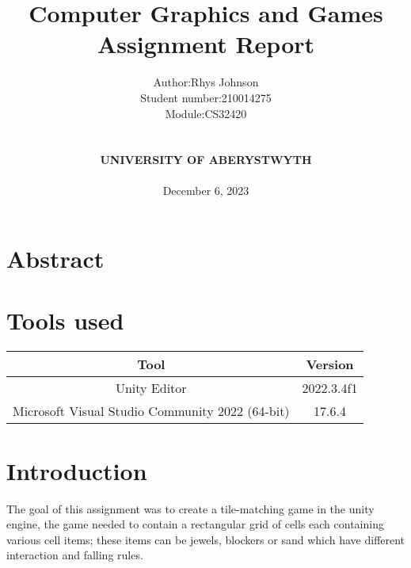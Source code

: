 \documentclass[12pt, a4paper]{article}
\title{%
	\textbf{Computer Graphics and Games Assignment Report} 
}
\author{
	\begin{tabular} {r l}
		Author: & Rhys Johnson \\
		Student number: & 210014275 \\
		Module: & CS32420
	\end{tabular} \\ \\\textbf{UNIVERSITY OF ABERYSTWYTH} 
	\\ \\ December 6, 2023
}
\date{}
\begin{document}
	\maketitle
	\pagebreak
	
	\section{Abstract}
	
	\section{Tools used}
	    \begin{center}
		\begin{tabular} {|| c | c ||}
			\hline
			Tool & Version \\
			\hline
			\hline
			Unity Editor & 2022.3.4f1 \\
			\hline
			Microsoft Visual Studio Community 2022 (64-bit) & 17.6.4 \\
			\hline
	    \end{tabular}
    	\end{center}

	\section{Introduction}
	The goal of this assignment was to create a tile-matching game in the unity engine, the game needed to contain a rectangular grid of cells
	each containing various cell items; these items can be jewels, blockers or sand which have different interaction and falling rules. 
\end{document}

